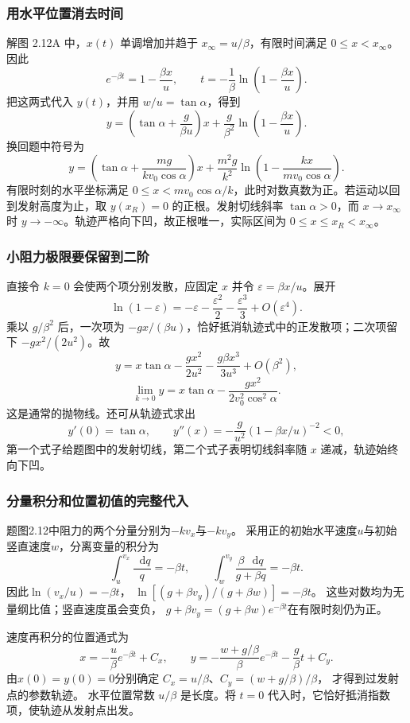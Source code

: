 \documentclass[UTF8,fontset=fandol,a4paper,11pt]{ctexart}
\newcommand{\dd}{\mathop{}\!\mathrm{d}}
\begin{document}
\subsubsection*{用水平位置消去时间}
解图 2.12A 中，$x(t)$ 单调增加并趋于 $x_\infty=u/\beta$，有限时间满足 $0\leq x<x_\infty$。因此
\[
e^{-\beta t}=1-\frac{\beta x}{u},\qquad
t=-\frac1\beta\ln\left(1-\frac{\beta x}{u}\right).
\]
把这两式代入 $y(t)$，并用 $w/u=\tan\alpha$，得到
\[
\boxed{y=\left(\tan\alpha+\frac g{\beta u}\right)x
+\frac g{\beta^2}\ln\left(1-\frac{\beta x}{u}\right)}.
\]
换回题中符号为
\[
y=\left(\tan\alpha+\frac{mg}{kv_0\cos\alpha}\right)x
+\frac{m^2g}{k^2}\ln\left(1-\frac{kx}{mv_0\cos\alpha}\right).
\]
有限时刻的水平坐标满足 $0\leq x<mv_0\cos\alpha/k$，此时对数真数为正。若运动以回到发射高度为止，取 $y(x_R)=0$ 的正根。发射切线斜率 $\tan\alpha>0$，而 $x\to x_\infty$ 时 $y\to-\infty$。轨迹严格向下凹，故正根唯一，实际区间为 $0\leq x\leq x_R<x_\infty$。

\subsubsection*{小阻力极限要保留到二阶}
直接令 $k=0$ 会使两个项分别发散，应固定 $x$ 并令 $\varepsilon=\beta x/u$。展开
\[
\ln(1-\varepsilon)=-\varepsilon-\frac{\varepsilon^2}{2}
-\frac{\varepsilon^3}{3}+O(\varepsilon^4).
\]
乘以 $g/\beta^2$ 后，一次项为 $-gx/(\beta u)$，恰好抵消轨迹式中的正发散项；二次项留下 $-gx^2/(2u^2)$。故
\[
y=x\tan\alpha-\frac{gx^2}{2u^2}-\frac{g\beta x^3}{3u^3}+O(\beta^2),
\]
\[
\boxed{\lim_{k\to0}y=x\tan\alpha-\frac{gx^2}{2v_0^2\cos^2\alpha}}.
\]
这是通常的抛物线。还可从轨迹式求出
\[
y'(0)=\tan\alpha,\qquad
y''(x)=-\frac g{u^2}(1-\beta x/u)^{-2}<0,
\]
第一个式子给题图中的发射切线，第二个式子表明切线斜率随 $x$ 递减，轨迹始终向下凹。
\subsubsection*{分量积分和位置初值的完整代入}
题图2.12中阻力的两个分量分别为$-kv_x$与$-kv_y$。
采用正的初始水平速度$u$与初始竖直速度$w$，分离变量的积分为
\[
\int_u^{v_x}\frac{\dd q}{q}=-\beta t,\qquad
\int_w^{v_y}\frac{\beta\,\dd q}{g+\beta q}=-\beta t.
\]
因此$\ln(v_x/u)=-\beta t$，
$\ln[(g+\beta v_y)/(g+\beta w)]=-\beta t$。
这些对数均为无量纲比值；竖直速度虽会变负，
$g+\beta v_y=(g+\beta w)e^{-\beta t}$在有限时刻仍为正。

速度再积分的位置通式为
\[
x=-\frac u\beta e^{-\beta t}+C_x,\qquad
y=-\frac{w+g/\beta}{\beta}e^{-\beta t}-\frac g\beta t+C_y.
\]
由$x(0)=y(0)=0$分别确定
$C_x=u/\beta$、$C_y=(w+g/\beta)/\beta$，
才得到过发射点的参数轨迹。
水平位置常数 $u/\beta$ 是长度。将 $t=0$ 代入时，它恰好抵消指数项，使轨迹从发射点出发。
\end{document}
